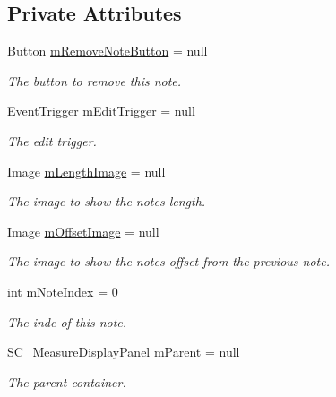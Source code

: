\subsection*{Private Attributes}
\begin{DoxyCompactItemize}
\item 
Button \hyperlink{group___s_c___n_d_p_priv_var_gac9af0bdc5b04a52ab9e7c13a0ad01ab7}{m\+Remove\+Note\+Button} = null
\begin{DoxyCompactList}\small\item\em The button to remove this note. \end{DoxyCompactList}\item 
Event\+Trigger \hyperlink{group___s_c___n_d_p_priv_var_ga3dd3e8ce9fbbe9b6b11d87e28df7dcfa}{m\+Edit\+Trigger} = null
\begin{DoxyCompactList}\small\item\em The edit trigger. \end{DoxyCompactList}\item 
Image \hyperlink{group___s_c___n_d_p_priv_var_ga611f26eaf6a960570b0dd848b6712b5f}{m\+Length\+Image} = null
\begin{DoxyCompactList}\small\item\em The image to show the note\textquotesingle{}s length. \end{DoxyCompactList}\item 
Image \hyperlink{group___s_c___n_d_p_priv_var_ga177d14cf2cac316a0bfc2e1096256a0c}{m\+Offset\+Image} = null
\begin{DoxyCompactList}\small\item\em The image to show the note\textquotesingle{}s offset from the previous note. \end{DoxyCompactList}\item 
int \hyperlink{group___s_c___n_d_p_priv_var_ga11933919195aba904a4e8bf95f131e49}{m\+Note\+Index} = 0
\begin{DoxyCompactList}\small\item\em The inde of this note. \end{DoxyCompactList}\item 
\hyperlink{class_s_c___measure_display_panel}{S\+C\+\_\+\+Measure\+Display\+Panel} \hyperlink{group___s_c___n_d_p_priv_var_ga360017747d9ed8910ddd4b3309477710}{m\+Parent} = null
\begin{DoxyCompactList}\small\item\em The parent container. \end{DoxyCompactList}\item 

\end{DoxyCompactItemize}
